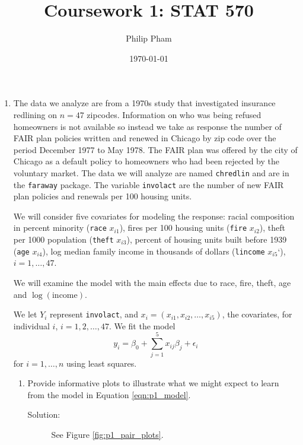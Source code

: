 \documentclass[letterpaper]{article}
\title{Coursework 1: STAT 570}
\author{Philip Pham}
\date{\today}
\begin{document}
\maketitle

\begin{enumerate}
\item The data we analyze are from a 1970s study that investigated insurance
  redlining on $n = 47$ zipcodes. Information on who was being refused
  homeowners is not available so instead we take as response the number of FAIR
  plan policies written and renewed in Chicago by zip code over the period
  December 1977 to May 1978. The FAIR plan was offered by the city of Chicago as
  a default policy to homeowners who had been rejected by the voluntary market.
  The data we will analyze are named \texttt{chredlin} and are in the
  \texttt{faraway} package. The variable \texttt{involact} are the number of new
  FAIR plan policies and renewals per 100 housing units.

  We will consider five covariates for modeling the response: racial composition
  in percent minority (\texttt{race} $x_{i1}$), fires per 100 housing units
  (\texttt{fire} $x_{i2}$), theft per 1000 population (\texttt{theft} $x_{i3}$),
  percent of housing units built before 1939 (\texttt{age} $x_{i4}$), log
  median family income in thousands of dollars (\texttt{lincome} $x_{i5}$`),
  $i = 1,\ldots,47$.

  We will examine the model with the main effects due to race, fire, theft, age
  and $\log(\mathrm{income})$.

  We let $Y_i$ represent \texttt{involact}, and
  $x_i = \left(x_{i1}, x_{i2}, \ldots, x_{i5}\right)$, the covariates, for
  individual $i$, $i = 1,2,\ldots,47$. We fit the model
  \begin{equation}
    y_i = \beta_0 + \sum_{j=1}^5x_{ij}\beta_j + \epsilon_i
    \label{eqn:p1_model}
  \end{equation}
  for $i=1,\ldots,n$ using least squares.

  \begin{enumerate}
  \item Provide informative plots to illustrate what we might expect to learn
    from the model in Equation \ref{eqn:p1_model}.

    \begin{description}
    \item[Solution:] See Figure \ref{fig:p1_pair_plots}.
    \end{description}    
  \end{enumerate}  
\end{enumerate}
\end{document}
